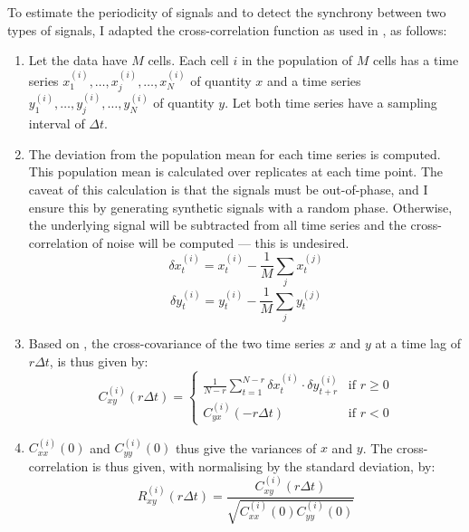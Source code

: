 To estimate the periodicity of signals and to detect the synchrony between two types of signals, I adapted the cross-correlation function as used in \textcite{pietschDeterminingGrowthRates2023}, as follows:

\begin{enumerate}
  \item Let the data have $M$ cells.
        Each cell $i$ in the population of $M$ cells has a time series $x_{1}^{(i)}, \ldots , x_{j}^{(i)}, \ldots , x_{N}^{(i)}$ of quantity $x$ and a time series $y_{1}^{(i)}, \ldots , y_{j}^{(i)}, \ldots , y_{N}^{(i)}$ of quantity $y$.
        Let both time series have a sampling interval of $\Delta t$.
  \item The deviation from the population mean for each time series is computed.
        This population mean is calculated over replicates at each time point.
        The caveat of this calculation is that the signals must be out-of-phase, and I ensure this by generating synthetic signals with a random phase.
        Otherwise, the underlying signal will be subtracted from all time series and the cross-correlation of noise will be computed --- this is undesired.
        \begin{equation}
          \delta x_{t}^{(i)} = x_{t}^{(i)} - \frac{1}{M} \sum_{j}x_{t}^{(j)}
          \label{eq:xcf-dmeans-x}
        \end{equation}
        \begin{equation}
          \delta y_{t}^{(i)} = y_{t}^{(i)} - \frac{1}{M} \sum_{j}y_{t}^{(j)}
          \label{eq:xcf-dmeans-y}
        \end{equation}
  \item Based on \textcite{kivietStochasticityMetabolismGrowth2014}, the cross-covariance of the two time series $x$ and $y$ at a time lag of $r\Delta t$, is thus given by:
        \begin{equation}
          C_{xy}^{(i)}(r\Delta t) =
          \begin{cases}
            \frac{1}{N-r} \sum_{t=1}^{N-r} \delta x_{t}^{(i)} \cdot \delta y_{t+r}^{(i)} & \text{if } r \geq 0 \\
            C_{yx}^{(i)}(-r \Delta t) & \text{if } r < 0
          \end{cases}
          \label{eq:xcf-xcov}
        \end{equation}
    \item $C_{xx}^{(i)}(0)$ and $C_{yy}^{(i)}(0)$ thus give the variances of $x$ and $y$.  The cross-correlation is thus given, with normalising by the standard deviation, by:
        \begin{equation}
          R_{xy}^{(i)}(r \Delta t) = \frac{C_{xy}^{(i)}(r \Delta t)}{\sqrt{C_{xx}^{(i)}(0) C_{yy}^{(i)}(0)}}
          \label{eq:xcf-xcf}
        \end{equation}
\end{enumerate}

